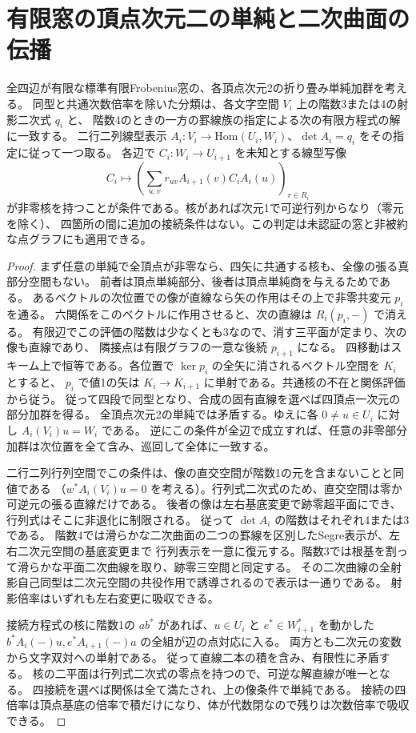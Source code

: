 \section{有限窓の頂点次元二の単純と二次曲面の伝播}
\label{sec:finite-two-dimensional-quadrics}
\begin{theorem}\label{thm:finite-two-dimensional-quadrics}
全四辺が有限な標準有限Frobenius窓の、各頂点次元2の折り畳み単純加群を考える。
同型と共通次数倍率を除いた分類は、各文字空間 $V_i$ 上の階数3または4の射影二次式 $q_i$ と、
階数4のときの一方の罫線族の指定による次の有限方程式の解に一致する。
二行二列線型表示 $A_i:V_i\to\mathrm{Hom}(U_i,W_i)$、$\det A_i=q_i$ をその指定に従って一つ取る。
各辺で $C_i:W_i\to U_{i+1}$ を未知とする線型写像
\[
 C_i\longmapsto\left(\sum_{u,v} r_{uv} A_{i+1}(v) C_i A_i(u)\right)_{r\in R_i}
\]
が非零核を持つことが条件である。核があれば次元1で可逆行列からなり（零元を除く）、
四箇所の間に追加の接続条件はない。この判定は未認証の窓と非被約な点グラフにも適用できる。
\end{theorem}
\begin{proof}
まず任意の単純で全頂点が非零なら、四矢に共通する核も、全像の張る真部分空間もない。
前者は頂点単純部分、後者は頂点単純商を与えるためである。
あるベクトルの次位置での像が直線なら矢の作用はその上で非零共変元 $p_i$ を通る。
六関係をこのベクトルに作用させると、次の直線は $R_i(p_i,-)$ で消える。
有限辺でこの評価の階数は少なくとも3なので、消す三平面が定まり、次の像も直線であり、
隣接点は有限グラフの一意な後続 $p_{i+1}$ になる。
四移動はスキーム上で恒等である。各位置で $\ker p_i$ の全矢に消されるベクトル空間を $K_i$ とすると、
$p_i$ で値1の矢は $K_i\to K_{i+1}$ に単射である。共通核の不在と関係評価から従う。
従って四段で同型となり、合成の固有直線を選べば四頂点一次元の部分加群を得る。
全頂点次元2の単純では矛盾する。ゆえに各 $0\ne u\in U_i$ に対し $A_i(V_i)u=W_i$ である。
逆にこの条件が全辺で成立すれば、任意の非零部分加群は次位置を全て含み、巡回して全体に一致する。

二行二列行列空間でこの条件は、像の直交空間が階数1の元を含まないことと同値である
（$w^*A_i(V_i)u=0$ を考える）。行列式二次式のため、直交空間は零か可逆元の張る直線だけである。
後者の像は左右基底変更で跡零超平面にでき、行列式はそこに非退化に制限される。
従って $\det A_i$ の階数はそれぞれ4または3である。
階数4では滑らかな二次曲面の二つの罫線を区別したSegre表示が、左右二次元空間の基底変更まで
行列表示を一意に復元する。階数3では根基を割って滑らかな平面二次曲線を取り、跡零三空間と同定する。
その二次曲線の全射影自己同型は二次元空間の共役作用で誘導されるので表示は一通りである。
射影倍率はいずれも左右変更に吸収できる。

接続方程式の核に階数1の $a b^*$ があれば、$u\in U_i$ と $e^*\in W_{i+1}^*$ を動かした
$b^* A_i(-)u, e^* A_{i+1}(-)a$ の全組が辺の点対応に入る。
両方とも二次元の変数から文字双対への単射である。
従って直線二本の積を含み、有限性に矛盾する。
核の二平面は行列式二次式の零点を持つので、可逆な解直線が唯一となる。
四接続を選べば関係は全て満たされ、上の像条件で単純である。
接続の四倍率は頂点基底の倍率で積だけになり、体が代数閉なので残りは次数倍率で吸収できる。
\end{proof}

